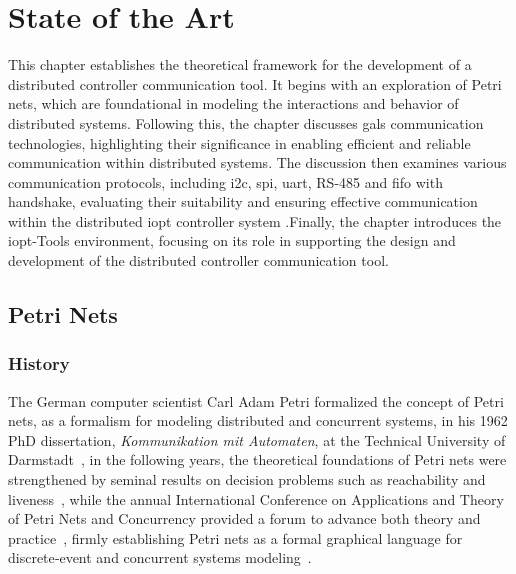
%

\chapter{State of the Art}
\label{cha:state_of_the_ art}


\epigraphfontsize{\small\itshape}
\setlength\epigraphwidth{12.5cm}
\setlength\epigraphrule{0pt}

This chapter establishes the theoretical framework for the development of a distributed controller communication tool. It begins with an exploration of Petri nets, which are foundational in modeling the interactions and behavior of distributed systems. Following this, the chapter discusses \gls{gals} communication technologies, highlighting their significance in enabling efficient and reliable communication within distributed systems. The discussion then examines various communication protocols, including \gls{i2c},  \gls{spi}, \gls{uart}, RS-485 and \gls{fifo} with handshake, evaluating their suitability and ensuring effective communication within the distributed \gls{iopt} controller system .Finally, the chapter introduces the \gls{iopt}-Tools environment, focusing on its role in supporting the design and development of the distributed controller communication tool.

\section{Petri Nets}
\label{sec:petri_nets}


\subsection{History}
\label{subsec:history}
The German computer scientist Carl Adam Petri formalized the concept of  Petri nets, as a formalism for modeling distributed and concurrent systems, in his 1962 PhD dissertation, \emph{Kommunikation mit Automaten}, at the Technical University of Darmstadt~\cite{petri1962}, in the following years, the theoretical foundations of Petri nets were strengthened by seminal results on decision problems such as reachability and liveness~\cite{murata}, while the annual International Conference on Applications and Theory of Petri Nets and Concurrency provided a forum to advance both theory and practice~\cite{ICPN1980}, firmly establishing Petri nets as a formal graphical language for discrete‐event and concurrent systems modeling~\cite{WikiPetriNet2025}.


